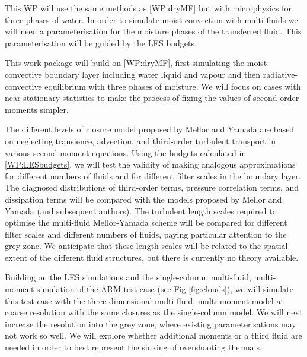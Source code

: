 \documentclass[11pt,a4paper]{article}
\begin{document}

This WP will use the same methods as \ref{WP:dryMF} but with microphysics for three phases of water. In order to simulate moist convection with multi-fluids we will need a parameterisation for the moisture phases of the transferred fluid. This parameterisation will be guided by the LES budgets. 

This work package will build on \ref{WP:dryMF}, first simulating the moist convective boundary layer including water liquid and vapour and then radiative-convective equilibrium with three phases of moisture. We will focus on cases with near stationary statistics to make the process of fixing the values of second-order moments simpler.


The different levels of closure model proposed by Mellor and Yamada are based on neglecting transience, advection, and third-order turbulent transport in various second-moment equations. Using the budgets calculated in \ref{WP:LESbudgets}, we will test the validity of making analogous approximations for different numbers of fluids and for different filter scales in the boundary layer. The diagnosed distributions of third-order terms, pressure correlation terms, and dissipation terms will be compared with the models proposed by Mellor and Yamada (and subsequent authors). The turbulent length scales required to optimise the multi-fluid Mellor-Yamada scheme will be compared for different filter scales and different numbers of fluids, paying particular attention to the grey zone. We anticipate that these length scales will be related to the spatial extent of the different fluid structures, but there is currently no theory available. 


Building on the LES simulations and the single-column, multi-fluid, multi-moment simulation of the ARM test case (see Fig \ref{fig:clouds}), we will simulate this test case with the three-dimensional multi-fluid, multi-moment model at coarse resolution with the same closures as the single-column model.  We will next increase the resolution into the grey zone, where existing parameterisations may not work so well. We will explore whether additional moments or a third fluid are needed in order to best represent the sinking of overshooting thermals. 
\end{document}
